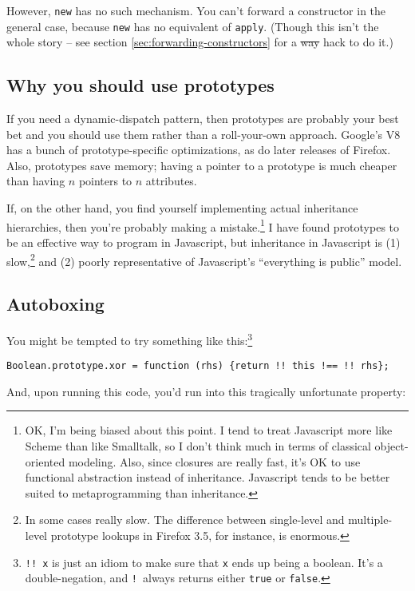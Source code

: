 \documentclass{article}
\begin{document}
    However, {\tt new} has no such mechanism. You can't forward a constructor in the general case, because {\tt new} has no equivalent of {\tt apply}. (Though this isn't the whole story -- see
    section \ref{sec:forwarding-constructors} for a \sout{way} hack to do it.)

\subsection {Why you should use prototypes}
    If you need a dynamic-dispatch pattern, then prototypes are probably your best bet and you should use them rather than a roll-your-own approach. Google's V8 has a bunch of
    prototype-specific optimizations, as do later releases of Firefox. Also, prototypes save memory; having a pointer to a prototype is much cheaper than having $n$ pointers to $n$ attributes.

    If, on the other hand, you find yourself implementing actual inheritance hierarchies, then you're probably making a mistake.\footnote{OK, I'm being biased about this point. I tend to treat
    Javascript more like Scheme than like Smalltalk, so I don't think much in terms of classical object-oriented modeling. Also, since closures are really fast, it's OK to use functional
    abstraction instead of inheritance. Javascript tends to be better suited to metaprogramming than inheritance.} I have found prototypes to be an effective way to program in Javascript, but
    inheritance in Javascript is (1) slow,\footnote{In some cases really slow. The difference between single-level and multiple-level prototype lookups in Firefox 3.5, for instance, is
    enormous.} and (2) poorly representative of Javascript's ``everything is public'' model.

\subsection {Autoboxing}
    \label{sec:autoboxing}
    You might be tempted to try something like this:\footnote{{\tt !!~x} is just an idiom to make sure that {\tt x} ends up being a boolean. It's a double-negation, and {\tt !}~always
    returns either {\tt true} or {\tt false}.}

\begin{verbatim}
Boolean.prototype.xor = function (rhs) {return !! this !== !! rhs};
\end{verbatim}

    And, upon running this code, you'd run into this tragically unfortunate property:
\end{document}
